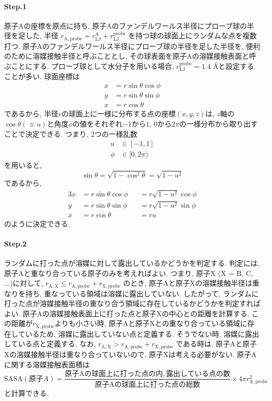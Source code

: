 \paragraph{Step.1} 原子Aの座標を原点に持ち, 原子Aのファンデルワールス半径にプローブ球の半径を足した, 半径
$r_{\mathrm{A, probe}} = r_{\mathrm{LJ}}^{\mathrm{A}} + r_{\mathrm{LJ}}^{\mathrm{probe}}$
を持つ球の球面上にランダムな点を複数打つ. 
原子Aのファンデルワールス半径にプローブ球の半径を足した半径を, 便利のために溶媒接触半径と呼ぶこととし, その球表面を原子Aの溶媒接触表面と呼ぶことにする. 
プローブ球として水分子を用いる場合, $r_{\mathrm{LJ}}^{\mathrm{probe}} = 1.4$ {\AA}と設定することが多い. 
球面座標は
\begin{align}
    x &= r \sin\theta \cos\phi \\
    y &= r \sin\theta \sin\phi \\
    x &= r \cos\theta
\end{align}
であるから, 半径$r$の球面上に一様に分布する点の座標$(x, y, z)$は, $z$軸の$\cos\theta (\equiv u)$と角度$\phi$の値をそれぞれ$-1$から$1$, $0$から$2\pi$の一様分布から取り出すことで決定できる. 
つまり, 2つの一様乱数
\begin{align}
    u    &\in [-1, 1] \\
    \phi &\in [0, 2\pi)
\end{align}
を用いると, 
\begin{equation}
    \sin \theta = \sqrt{1 - \cos^{2} \theta} = \sqrt{1 - u^{2}}
\end{equation}
であるから, 
\begin{alignat}{3}
    x &= r \sin\theta \cos\phi &&= r \sqrt{1 - u^{2}} \cos\phi \\
    y &= r \sin\theta \sin\phi &&= r \sqrt{1 - u^{2}} \sin\phi \\
    x &= r \cos\theta          &&= r u
\end{alignat}
のように決定できる. 

\paragraph{Step.2} ランダムに打った点が溶媒に対して露出しているかどうかを判定する. 
判定には, 原子Aと重なり合っている原子のみを考えればよい. 
つまり, 原子X (X = B, C, ...)に対して, 
$
r_{\mathrm{A, X}} \le r_{\mathrm{A, probe}} + r_{\mathrm{X, probe}}
$
のとき, 原子Aと原子Xの溶媒接触半径は重なりを持ち, 重なっている領域は溶媒に露出していない. 
したがって, ランダムに打った点が溶媒接触半径の重なり合う領域に存在しているかどうかを判定すればよい. 
原子Aの溶媒接触表面上に打った点と原子Xの中心との距離を計算する. 
この距離が$r_{\mathrm{X, probe}}$よりも小さい時, 原子Aと原子Xとの重なり合っている領域に存在しているため, 溶媒に露出していない点と定義する. そうでない時, 溶媒に露出している点と定義する. 
なお, 
$
r_{\mathrm{A, X}} > r_{\mathrm{A, probe}} + r_{\mathrm{X, probe}}
$
である時は, 原子Aと原子Xの溶媒接触半径は重なり合っていないので, 原子Xは考える必要がない. 
原子Aに関する溶媒接触表面積は
\begin{equation}
    \mathrm{SASA} (\mathrm{原子}A)
    =
    \frac{\mathrm{原子Aの球面上に打った点の内, 露出している点の数}}{\mathrm{原子Aの球面上に打った点の総数}} \times 4 \pi r_{\mathrm{A, probe}}^{2}
\end{equation}
と計算できる. 

